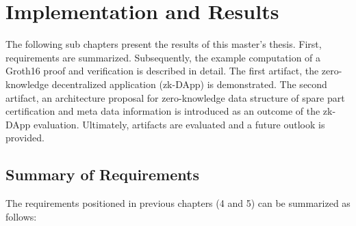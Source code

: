 \chapter{Implementation and Results}
The following sub chapters present the results of this master's thesis. First, requirements are summarized. Subsequently, the example computation of a Groth16 proof and verification is described in detail. The first artifact, the zero-knowledge decentralized application (zk-DApp) is demonstrated. The second artifact, an architecture proposal for zero-knowledge data structure of spare part certification and meta data information is introduced as an outcome of the zk-DApp evaluation. Ultimately, artifacts are evaluated and a future outlook is provided.

\section{Summary of Requirements}
The requirements positioned in previous chapters (4 and 5) can be summarized as follows: 

